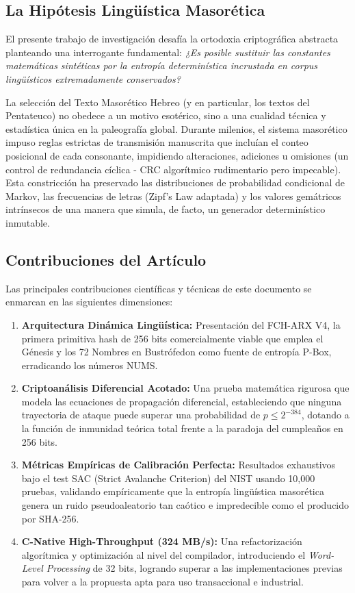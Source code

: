 \documentclass[10pt,journal,compsoc]{IEEEtran}
\begin{document}
\subsection{La Hipótesis Lingüística Masorética}
El presente trabajo de investigación desafía la ortodoxia criptográfica abstracta planteando una interrogante fundamental: \textit{¿Es posible sustituir las constantes matemáticas sintéticas por la entropía determinística incrustada en corpus lingüísticos extremadamente conservados?} 

La selección del Texto Masorético Hebreo (y en particular, los textos del Pentateuco) no obedece a un motivo esotérico, sino a una cualidad técnica y estadística única en la paleografía global. Durante milenios, el sistema masorético impuso reglas estrictas de transmisión manuscrita que incluían el conteo posicional de cada consonante, impidiendo alteraciones, adiciones u omisiones (un control de redundancia cíclica - CRC algorítmico rudimentario pero impecable). Esta constricción ha preservado las distribuciones de probabilidad condicional de Markov, las frecuencias de letras (Zipf's Law adaptada) y los valores gemátricos intrínsecos de una manera que simula, de facto, un generador determinístico inmutable.

\subsection{Contribuciones del Artículo}
Las principales contribuciones científicas y técnicas de este documento se enmarcan en las siguientes dimensiones:
\begin{enumerate}
    \item \textbf{Arquitectura Dinámica Lingüística:} Presentación del FCH-ARX V4, la primera primitiva hash de 256 bits comercialmente viable que emplea el Génesis y los 72 Nombres en Bustrófedon como fuente de entropía P-Box, erradicando los números NUMS.
    \item \textbf{Criptoanálisis Diferencial Acotado:} Una prueba matemática rigurosa que modela las ecuaciones de propagación diferencial, estableciendo que ninguna trayectoria de ataque puede superar una probabilidad de $p \leq 2^{-384}$, dotando a la función de inmunidad teórica total frente a la paradoja del cumpleaños en 256 bits.
    \item \textbf{Métricas Empíricas de Calibración Perfecta:} Resultados exhaustivos bajo el test SAC (Strict Avalanche Criterion) del NIST usando 10,000 pruebas, validando empíricamente que la entropía lingüística masorética genera un ruido pseudoaleatorio tan caótico e impredecible como el producido por SHA-256.
    \item \textbf{C-Native High-Throughput (324 MB/s):} Una refactorización algorítmica y optimización al nivel del compilador, introduciendo el \textit{Word-Level Processing} de 32 bits, logrando superar a las implementaciones previas para volver a la propuesta apta para uso transaccional e industrial.
\end{enumerate}
\end{document}
